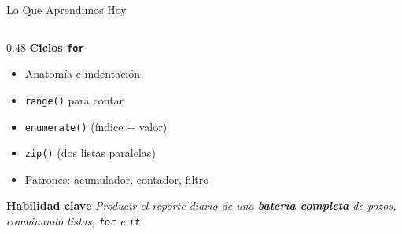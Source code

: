 \documentclass[aspectratio=169, 11pt]{beamer}
\begin{document}
\begin{frame}{Lo Que Aprendimos Hoy}
\begin{columns}[T]
    \begin{column}{0.48\textwidth}
      {\footnotesize\color{arcaDark}\bfseries Ciclos \texttt{for}}
      \vspace{3pt}
      {\footnotesize\color{textMuted}
      \begin{itemize}\setlength{\itemsep}{1pt}
        \item[{\color{codeGreen}\scriptsize\faCheck}]
          Anatomía e indentación
        \item[{\color{codeGreen}\scriptsize\faCheck}]
          \texttt{range()} para contar
        \item[{\color{codeGreen}\scriptsize\faCheck}]
          \texttt{enumerate()} (índice + valor)
        \item[{\color{codeGreen}\scriptsize\faCheck}]
          \texttt{zip()} (dos listas paralelas)
        \item[{\color{codeGreen}\scriptsize\faCheck}]
          Patrones: acumulador, contador, filtro
      \end{itemize}
      }

      \vspace{5pt}
      {\footnotesize\color{arcaDark}\bfseries Habilidad clave}
      \vspace{2pt}
      {\scriptsize\color{textMuted}\itshape
        Producir el reporte diario de una
        \textbf{batería completa} de pozos,
        combinando listas, \texttt{for} e \texttt{if}.}
    \end{column}
  \end{columns}
\end{frame}
\end{document}
